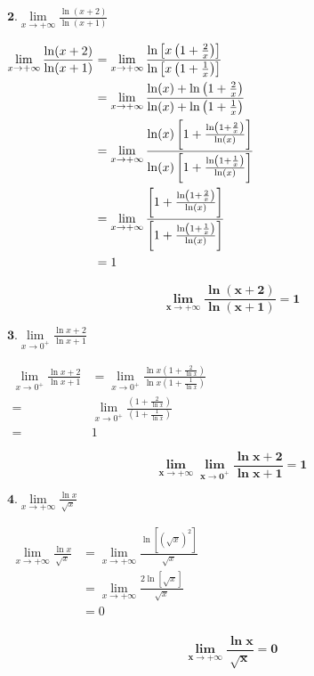 \documentclass[12pt,a4paper]{article}
\begin{document}
\( \textbf{2.} \lim\limits_{x \to +\infty} \frac{\ln(x+2)}{\ln(x+1)} \)

\(
\begin{aligned}
\lim\limits_{x \to +\infty} \frac{\ln(x+2)}{\ln(x+1)}&= \lim\limits_{x \to +\infty} \frac{\ln\left[x\left( 1+ \frac{2}{x}\right) \right]}{\ln\left[x\left( 1+ \frac{1}{x}\right) \right]}\\
&= \lim\limits_{x \to +\infty} \frac{ \ln(x) + \ln\left( 1+ \frac{2}{x}\right) }{ \ln(x) + \ln\left( 1+ \frac{1}{x}\right)}\\
&= \lim\limits_{x \to +\infty} \frac{ \ln(x) \left[ 1+ \frac{\ln\left( 1+ \frac{2}{x}\right)}{\ln(x)} \right] }{ \ln(x) \left[ 1+ \frac{\ln\left( 1+ \frac{1}{x}\right)}{\ln(x)} \right]}\\
&= \lim\limits_{x \to +\infty} \frac{ \left[ 1+ \frac{\ln\left( 1+ \frac{2}{x}\right)}{\ln(x)} \right] }{ \left[1+ \frac{\ln\left( 1+ \frac{1}{x}\right)}{\ln(x)} \right]}\\
&= 1\\
\end{aligned}\\
\)

\begin{resultbox}
    \[
    \mathbf{\lim\limits_{x \to +\infty} \frac{\ln(x+2)}{\ln(x+1)}=1}
    \]
\end{resultbox}

\( \textbf{3.} \lim\limits_{x \to 0^+} \frac{\ln x+2}{\ln x+1} \)

\(
\begin{aligned}
\lim\limits_{x \to 0^+} \frac{\ln x+2}{\ln x+1} &=\lim\limits_{x \to 0^+} \frac{\ln x\left(1+\frac{2}{\ln x}\right)}{\ln x\left(1+\frac{1}{\ln x}\right)}\\
=&\lim\limits_{x \to 0^+} \frac{\left(1+\frac{2}{\ln x}\right)}{\left(1+\frac{1}{\ln x}\right)}\\
=&1
\end{aligned}
\)

\begin{resultbox}
    \[
    \mathbf{\lim\limits_{x \to +\infty} \lim\limits_{x \to 0^+} \frac{\ln x+2}{\ln x+1}=1}
    \]
\end{resultbox}

\(
\textbf{4.} \lim\limits_{x \to +\infty} \frac{\ln x}{\sqrt{x}}
\)

\(
\begin{aligned}
\lim\limits_{x \to +\infty} \frac{\ln x}{\sqrt{x}}&=\lim\limits_{x \to +\infty} \frac{\ln\left[(\sqrt{x})^{2}\right] }{\sqrt{x}}\\
&=\lim\limits_{x \to +\infty} \frac{2\ln\left[\sqrt{x}\right] }{\sqrt{x}}\\
&=0\\
\end{aligned}
\)

\begin{resultbox}
    \[
    \mathbf{\lim\limits_{x \to +\infty} \frac{\ln x}{\sqrt{x}}=0}
    \]
\end{resultbox}
\end{document}
